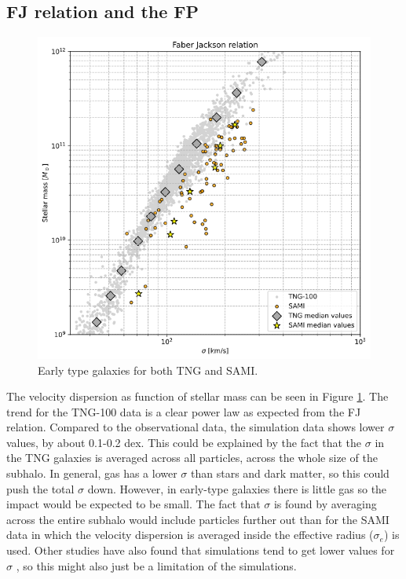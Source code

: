 \subsection{FJ relation and the FP}

\begin{figure}
    \centering
    \includegraphics[width=\textwidth]{images/faber_jackson.png}
    \caption{Early type galaxies for both TNG and SAMI.}
    \label{FJ_results}
\end{figure}

The velocity dispersion as function of stellar mass can be seen in Figure \ref{FJ_results}. The trend for the TNG-100 data is a clear power law as expected from the FJ relation. Compared to the observational data, the simulation data shows lower $\sigma$ values, by about 0.1-0.2 dex. This could be explained by the fact that the $\sigma$ in the TNG galaxies is averaged across all particles, across the whole size of the subhalo. In general, gas has a lower $\sigma$ than stars and dark matter, so this could push the total $\sigma$ down. However, in early-type galaxies there is little gas so the impact would be expected to be small. The fact that $\sigma$ is found by averaging across the entire subhalo would include particles further out than for the SAMI data in which the velocity dispersion is averaged inside the effective radius ($\sigma_{e}$) is used. Other studies have also found that simulations tend to get lower values for $\sigma$ \parencite{Sande2018}, so this might also just be a limitation of the simulations.